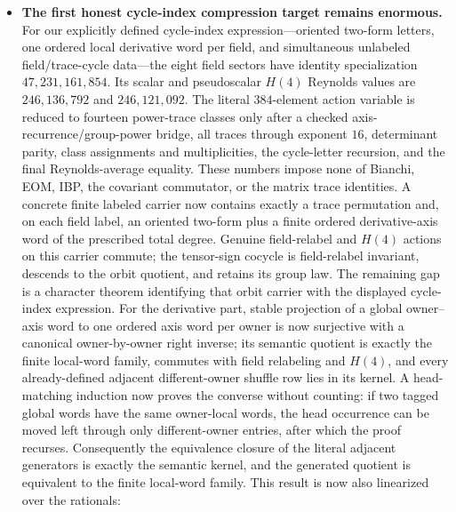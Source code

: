 \documentclass[11pt]{article}
\theoremstyle{definition}
\begin{document}
\begin{itemize}
    normalization the sharp row-$\ell^1$ dual constant is
    $14739388451343/30664304$, attained at row $30$.  This is the
    derivative-free trace quotient, not the derivative-coupled joint physical
    quotient
    (\texttt{HypercubicDimension16PhysicalTraceQuotient},
    \texttt{HypercubicDimension16PhysicalTracePublicConditioning}).
  \item \textbf{The first honest cycle-index compression target remains
    enormous.} For our explicitly defined cycle-index expression---oriented
    two-form letters, one ordered local derivative word per field, and
    simultaneous unlabeled field/trace-cycle data---the eight field sectors
    have identity specialization $47{,}231{,}161{,}854$.  Its scalar and
    pseudoscalar $H(4)$ Reynolds values are
    $246{,}136{,}792$ and $246{,}121{,}092$.  The literal $384$-element action
    variable is reduced to fourteen power-trace classes only after a checked
    axis-recurrence/group-power bridge, all traces through exponent $16$,
    determinant parity, class assignments and multiplicities, the
    cycle-letter recursion, and the final Reynolds-average equality.  These
    numbers impose none of Bianchi, EOM, IBP, the covariant commutator, or the
    matrix trace identities.  A concrete finite labeled carrier now contains
    exactly a trace permutation and, on each field label, an oriented
    two-form plus a finite ordered derivative-axis word of the prescribed
    total degree.  Genuine field-relabel and $H(4)$ actions on this carrier
    commute; the tensor-sign cocycle is field-relabel invariant, descends to
    the orbit quotient, and retains its group law.  The remaining gap is a
    character theorem identifying that orbit carrier with the displayed
    cycle-index expression.  For the derivative part, stable projection of a
    global owner--axis word to one ordered axis word per owner is now
    surjective with a canonical owner-by-owner right inverse; its semantic
    quotient is exactly the finite local-word family, commutes with field
    relabeling and $H(4)$, and every already-defined adjacent different-owner
    shuffle row lies in its kernel.  A head-matching induction now proves the
    converse without counting: if two tagged global words have the same
    owner-local words, the head occurrence can be moved left through only
    different-owner entries, after which the proof recurses.  Consequently
    the equivalence closure of the literal adjacent generators is exactly the
    semantic kernel, and the generated quotient is equivalent to the finite
    local-word family.  This result is now also linearized over the rationals:

\end{itemize}
\end{document}
